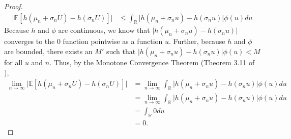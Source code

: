 \begin{proof}
    \begin{align*}
        \lvert \mathbb{E}[h(\mu_n + \sigma_n U) - h(\sigma_n U)] \rvert
        & \leq
        \int_{\mathbb{R}} \lvert h(\mu_n + \sigma_n u) - h(\sigma_n u) \rvert \phi(u) du
    \end{align*}
    Because $h$ and $\phi$ are continuous, we know that $\lvert h(\mu_n + \sigma_n u) - h(\sigma_n u) \rvert$ converges to the 0 function pointwise as a function $u$.
    Further, because $h$ and $\phi$ are bounded, there exists an $M'$ such that $\lvert h(\mu_n + \sigma_n u) - h(\sigma_n u) \rvert \phi(u) < M$ for all $u$ and $n$.
    Thus, by the Monotone Convergence Theorem (Theorem 3.11 of \cite{axler2020}),
    \begin{align*}
        \lim_{n \to \infty} \lvert \mathbb{E}[h(\mu_n + \sigma_n U) - h(\sigma_n U)] \rvert
        & = \lim_{n\to\infty} \int_{\mathbb{R}} \lvert h(\mu_n + \sigma_n u) - h(\sigma_n u) \rvert \phi(u) du \\
        & = \lim_{n\to\infty} \int_{\mathbb{R}} \lvert h(\mu_n + \sigma_n u) - h(\sigma_n u) \rvert \phi(u) du \\
        & =  \int_{\mathbb{R}} 0 du \\
        & = 0.
    \end{align*}


\end{proof}
